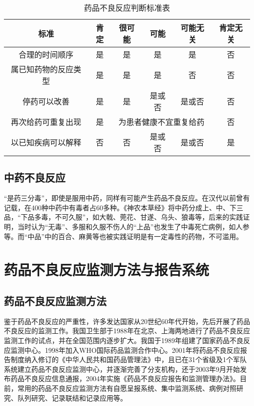 \begin{table}[ht]
    \caption{药品不良反应判断标准表}
    \label{tab3-2}
    \centering
    \begin{tabular}{cccccc}
    \toprule
    标准 & 肯定 & 很可能 & 可能 & 可能无关 & 肯定无关\\
    \midrule
    合理的时间顺序 & 是 & 是 & 是 & 是 & 否\\
    属已知药物的反应类型 & 是 & 是 & 是 & 否 & 否\\
    停药可以改善 & 是 & 是 & 是或否 & 是或否 & 否\\
    再次给药可重复出现 & 是 & \multicolumn{3}{c}{为患者健康不宜重复给药} & 否 \\
    以已知疾病可以解释 & 否 & 否 & 是或否 & 是或否 & 是\\
    \bottomrule
    \end{tabular}
\end{table}

\subsection{中药不良反应}

“是药三分毒”，即使是服用中药，同样有可能产生药品不良反应。在汉代以前曾有记载，在400种中药中有毒者占60多种。《神农本草经》将中药分成上、中、下三品，“下品多毒，不可久服”，如大戟、莞花、甘遂、乌头、狼毒等，后来的实践证明，当时认为“无毒”、多服和久服不伤人的“上品”也发生了中毒死亡病例，如人参等。而“中品”中的百合、麻黄等也被实践证明是有一定毒性的药物，不可滥用。

\section{药品不良反应监测方法与报告系统}

\subsection{药品不良反应监测方法}

鉴于药品不良反应的严重性，许多发达国家从20世纪60年代开始，先后开展了药品不良反应的监测工作。我国卫生部于1988年在北京、上海两地进行了药品不良反应监测工作的试点，并在全国范围内逐步扩大。我国于1989年组建了国家药品不良反应监测中心。1998年加入WHO国际药品监测合作中心。2001年将药品不良反应报告制度纳入修订的《中华人民共和国药品管理法》中，且已在31个省级及1个军队系统建立药品不良反应监测中心，并逐渐完善了分支机构，还于2003年9月开始发布药品不良反应信息通报，2004年实施《药品不良反应报告和监测管理办法》。目前，常用的药品不良反应监测方法有自愿呈报系统、集中监测系统、病例对照研究、队列研究、记录联结和记录应用等。


